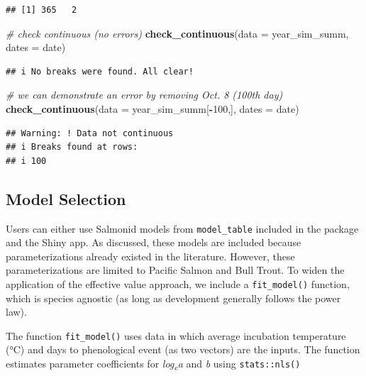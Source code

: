 \documentclass[webpdf,large,contemporary,namedate]{oup-authoring-template}
\newenvironment{Shaded}{\begin{snugshade}}{\end{snugshade}}
\newcommand{\AttributeTok}[1]{\textcolor[rgb]{0.13,0.29,0.53}{#1}}
\newcommand{\CommentTok}[1]{\textcolor[rgb]{0.56,0.35,0.01}{\textit{#1}}}
\newcommand{\DecValTok}[1]{\textcolor[rgb]{0.00,0.00,0.81}{#1}}
\newcommand{\FunctionTok}[1]{\textcolor[rgb]{0.13,0.29,0.53}{\textbf{#1}}}
\newcommand{\NormalTok}[1]{#1}
\newcommand{\SpecialCharTok}[1]{\textcolor[rgb]{0.81,0.36,0.00}{\textbf{#1}}}
\theoremstyle{thmstyleone}
\theoremstyle{thmstyletwo}
\theoremstyle{thmstylethree}
\begin{document}
\begin{verbatim}
## [1] 365   2
\end{verbatim}

\begin{Shaded}
\begin{Highlighting}[]
\CommentTok{\# check continuous (no errors)}
\FunctionTok{check\_continuous}\NormalTok{(}\AttributeTok{data =}\NormalTok{ year\_sim\_summ,}
                 \AttributeTok{dates =}\NormalTok{ date)}
\end{Highlighting}
\end{Shaded}

\begin{verbatim}
## i No breaks were found. All clear!
\end{verbatim}

\begin{Shaded}
\begin{Highlighting}[]
\CommentTok{\# we can demonstrate an error by removing Oct. 8 (100th day)}
\FunctionTok{check\_continuous}\NormalTok{(}\AttributeTok{data =}\NormalTok{ year\_sim\_summ[}\SpecialCharTok{{-}}\DecValTok{100}\NormalTok{,],}
                 \AttributeTok{dates =}\NormalTok{ date)}
\end{Highlighting}
\end{Shaded}

\begin{verbatim}
## Warning: ! Data not continuous
## i Breaks found at rows:
## i 100
\end{verbatim}

\subsection{Model Selection}\label{model-selection}

Users can either use Salmonid models from \texttt{model\_table} included
in the package and the Shiny app. As discussed, these models are
included because parameterizations already existed in the literature.
However, these parameterizations are limited to Pacific Salmon and Bull
Trout. To widen the application of the effective value approach, we
include a \texttt{fit\_model()} function, which is species agnostic (as
long as development generally follows the power law).

The function \texttt{fit\_model()} uses data in which average incubation
temperature (°C) and days to phenological event (as two vectors) are the
inputs. The function estimates parameter coefficients for
\emph{log\textsubscript{e}a} and \emph{b} using \texttt{stats::nls()}
\end{document}
